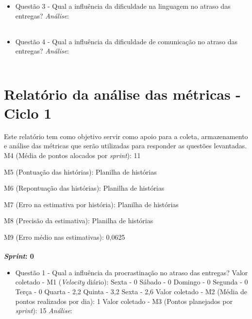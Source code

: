 \begin{apendicesenv}
\begin{itemize}
	  \item Questão 3 - Qual a influência da dificuldade na linguagem no atraso das entregas?
	    \subitem \textit{Análise}:
	  \\
	  \\
	  
	  \item Questão 4 - Qual a influência da dificuldade de comunicação no atraso das entregas?
	    \subitem \textit{Análise}:
	  \\
	  \\
	  
	\end{itemize}
	
	\chapter{Relatório da análise das métricas - Ciclo 1}
	
	Este relatório tem como objetivo servir como apoio para a coleta, armazenamento e análise das métricas que serão 
	utilizadas para responder as questões levantadas.
	\\
	

	M4 (Média de pontos alocados por \textit{sprint}): 11
	
	M5 (Pontuação das histórias): Planilha de histórias
	
	M6 (Repontuação das histórias): Planilha de histórias
	
	M7 (Erro na estimativa por história): Planilha de histórias
	
	M8 (Precisão da estimativa): Planilha de histórias
	
	M9 (Erro médio nas estimativas): 0,0625
	\\
	\\
	\textbf{\textit{Sprint}: 0}
	
	\begin{itemize}
	  
	  \item Questão 1 - Qual a influência da procrastinação no atraso das entregas?
	    \subitem Valor coletado - M1 (\textit{Velocity} diário):
	      \subsubitem Sexta - 0
	      \subsubitem Sábado - 0
	      \subsubitem Domingo - 0
	      \subsubitem Segunda - 0
	      \subsubitem Terça - 0
	      \subsubitem Quarta - 2,2
	      \subsubitem Quinta - 3,2
	      \subsubitem Sexta - 2,6
	    \subitem Valor coletado - M2 (Média de pontos realizados por dia): 1
	    \subitem Valor coletado - M3 (Pontos planejados por \textit{sprint}): 15
	    \subitem \textit{Análise}:
	    \\
	    \\


\end{itemize}
\end{apendicesenv}
